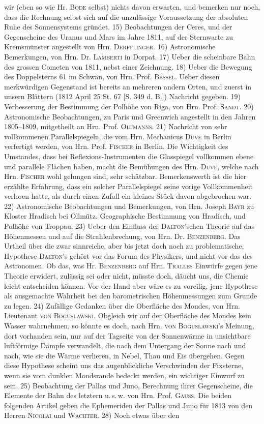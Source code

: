 \noindent wir (eben so wie Hr. \textsc{Bode} selbst) nichts davon erwarten, und bemerken nur noch, dass die Rechnung selbst sich auf die unzulässige Voraussetzung der absoluten Ruhe des Sonnensystems gründet. 15) Beobachtungen der Ceres, und der Gegenscheine des Uranus und Mars im Jahre 1811, auf der Sternwarte zu Kremsmünster angestellt von Hrn. \textsc{Derfflinger}. 16) Astronomische Bemerkungen, von Hrn. Dr. \textsc{Lamberti} in Dorpat. 17) Ueber die scheinbare Bahn des grossen Cometen von 1811, nebst einer Zeichnung. 18) Ueber die Bewegung des Doppelsterns 61 im Schwan, von Hrn. Prof. \textsc{Bessel}. Ueber diesen merkwürdigen Gegenstand ist bereits an mehreren andern Orten, und zuerst in unsern Blättern (1812 April 25 St. 67 [S. 349 d. B.]) Nachricht gegeben. 19) Verbesserung der Bestimmung der Polhöhe von Riga, von Hrn. Prof. \textsc{Sandt}. 20) Astronomische Beobachtungen, zu Paris und Greenwich angestellt in den Jahren 1805--1809, mitgetheilt an Hrn. Prof. \textsc{Oltmanns}. 21) Nachricht von sehr vollkommenen Parallelspiegeln, die vom Hrn. Mechanicus \textsc{Duve} in Berlin verfertigt werden, von Hrn. Prof. \textsc{Fischer} in Berlin. Die Wichtigkeit des Umstandes, dass bei Reflexions-Instrumenten die Glasspiegel vollkommen ebene und parallele Flächen haben, macht die Bemühungen des Hrn. \textsc{Duve}, welche nach Hrn. \textsc{Fischer} wohl gelungen sind, sehr schätzbar. Bemerkenswerth ist die hier erzählte Erfahrung, dass ein solcher Parallelspiegel seine vorige Vollkommenheit verloren hatte, als durch einen Zufall ein kleines Stück davon abgebrochen war. 22) Astronomische Beobachtungen und Bemerkungen, von Hrn. Joseph \textsc{Bayr} zu Kloster Hradisch bei Ollmütz. Geographische Bestimmung von Hradisch, und Polhöhe von Troppau. 23) Ueber den Einfluss der \textsc{Dalton}'schen Theorie auf das Höhenmessen und auf die Strahlenbrechung, von Hrn. Dr. \textsc{Benzenberg}. Das Urtheil über die zwar sinnreiche, aber bis jetzt doch noch zu problematische, Hypothese \textsc{Dalton}'s gehört vor das Forum des Physikers, und nicht vor das des Astronomen. Ob das, was Hr. \textsc{Benzenberg} auf Hrn. \textsc{Tralles} Einwürfe gegen jene Theorie erwidert, zulässig sei oder nicht, müsste doch, däucht uns, die Chemie leicht entscheiden können. Vor der Hand aber wäre es zu voreilig, jene Hypothese als ausgemachte Wahrheit bei den barometrischen Höhenmessungen zum Grunde zu legen. 24) Zufällige Gedanken über die Oberfläche des Mondes, von Hrn. Lieutenant \textsc{von Boguslawski}. Obgleich wir auf der Oberfläche des Mondes kein Wasser wahrnehmen, so könnte es doch, nach Hrn. \textsc{von Boguslawski}'s Meinung, dort vorhanden sein, nur auf der Tagseite von der Sonnenwärme in unsichtbare luftförmige Dämpfe verwandelt, die nach dem Untergang der Sonne nach und nach, wie sie die Wärme verlieren, in Nebel, Thau und Eis übergehen. Gegen diese Hypothese scheint uns das augenblickliche Verschwinden der Fixsterne, wenn sie vom dunklen Mondsrande bedeckt werden, ein wichtiger Einwurf zu sein. 25) Beobachtung der Pallas und Juno, Berechnung ihrer Gegenscheine, die Elemente der Bahn des letztern u.\,s.\,w. von Hrn. Prof. \textsc{Gauss}. Die beiden folgenden Artikel geben die Ephemeriden der Pallas und Juno für 1813 von den Herren \textsc{Nicolai} und \textsc{Wachter}. 28) Noch etwas über den 